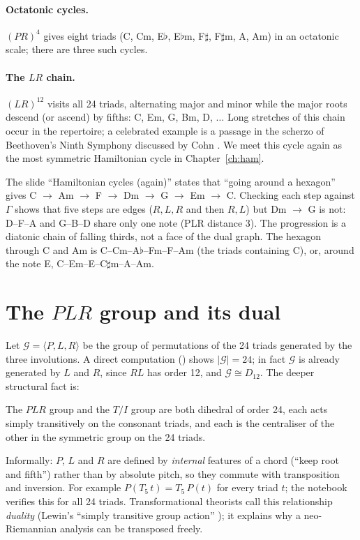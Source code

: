 \paragraph{Octatonic cycles.} $(PR)^4$ gives eight triads (C, Cm, E$\flat$, E$\flat$m, F$\sharp$, F$\sharp$m, A, Am) in an
octatonic scale; there are three such cycles.

\paragraph{The $LR$ chain.} $(LR)^{12}$ visits all 24 triads, alternating major and minor while the major roots
descend (or ascend) by fifths: C, Em, G, Bm, D, $\dots$ Long stretches of this chain occur in the repertoire; a
celebrated example is a passage in the scherzo of Beethoven's Ninth Symphony discussed by Cohn \citep{cohn1997}.
We meet this cycle again as the most symmetric Hamiltonian cycle in Chapter~\ref{ch:ham}.

\begin{correctionbox}
The slide ``Hamiltonian cycles (again)'' states that ``going around a hexagon'' gives
C $\to$ Am $\to$ F $\to$ Dm $\to$ G $\to$ Em $\to$ C. Checking each step against $\Gamma$ shows that five steps are
edges ($R,L,R$ and then $R,L$) but Dm $\to$ G is not: D--F--A and G--B--D share only one note (PLR distance 3).
The progression is a diatonic chain of falling thirds, not a face of the dual graph. The hexagon through C and Am
is C--Cm--A$\flat$--Fm--F--Am (the triads containing C), or, around the note E, C--Em--E--C$\sharp$m--A--Am.
\end{correctionbox}

\section{The $PLR$ group and its dual}
Let $\mathcal{G}=\langle P,L,R\rangle$ be the group of permutations of the 24 triads generated by the three
involutions. A direct computation () shows $|\mathcal G|=24$; in fact $\mathcal G$ is
already generated by $L$ and $R$, since $RL$ has order 12, and $\mathcal G\cong D_{12}$. The deeper structural
fact is:

\begin{theorem}
The $PLR$ group and the $T/I$ group are both dihedral of order 24, each acts simply transitively on the
consonant triads, and each is the centraliser of the other in the symmetric group on the 24 triads.
\end{theorem}
Informally: $P$, $L$ and $R$ are defined by \emph{internal} features of a chord (``keep root and fifth'') rather
than by absolute pitch, so they commute with transposition and inversion. For example
$P(T_5\,t)=T_5\,P(t)$ for every triad $t$; the notebook verifies this for all 24 triads. Transformational theorists
call this relationship \emph{duality} (Lewin's ``simply transitive group action'' \citep{lewin1987}); it explains
why a neo-Riemannian analysis can be transposed freely.

